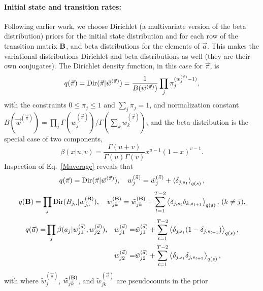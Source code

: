 \paragraph{Initial state and transition rates:}
Following earlier
work\cite{Mackay1997,Beal2003,Bronson2009,Persson2013}, we choose
Dirichlet (a multivariate version of the beta
distribution\cite{wiki:dirichlet}) priors for the initial state
distribution and for each row of the transition matrix $\mathbf{B}$,
and beta distributions for the elements of $\vec a$. This makes the
variational distributions Dirichlet and beta distributions as well
(they are their own conjugates). The Dirichlet density function, in
this case for $\vec\pi$, is
\begin{equation}\label{eq:p0pi}
        q(\vec\pi)=\text{Dir}(\vec\pi|\vec{w}^{(\vec{\pi})})=\frac{1}{B(\vec
        w^{(\vec\pi)})}\prod_j \pi_j^{(w_j^{(\vec\pi)}-1)},
\end{equation}
with the constraints $0\le \pi_j\le1$ and $\sum_j\pi_j=1$, and
normalization constant $B(\vec
w^{(\vec\pi)})=\prod_j\Gamma(w_j^{(\vec\pi)})/\Gamma(\sum_kw_k^{(\vec\pi)})$\cite{wiki:dirichlet},
and the beta distribution is the special case of two components,
\begin{equation}
\beta(x|u,v)=\frac{\Gamma(u+v)}{\Gamma(u)\Gamma(v)}x^{u-1}(1-x)^{v-1}.
\end{equation}
Inspection of Eq.~\eqref{Maverage} reveals that
\begin{equation}\label{VBM_pi}
  q(\vec{\pi})=\text{Dir}(\vec{\pi}|\vec{w}^{(\vec{\pi})}),\quad
w_j^{(\vec{\pi})}=\tilde
w_j^{(\vec{\pi})}+\left\langle \delta_{j,s_1}\right\rangle_{q(s)},
\end{equation}
\begin{equation}\label{VBM_B}
  q(\mathbf{B})=\prod_j
  \text{Dir}(B_{j,:}|w_{j,:}^{(\mathbf{B})}),\quad
w_{jk}^{(\mathbf{B})}=\tilde w_{jk}^{(\mathbf{B})}
  +\sum_{t=1}^{T-2}\left\langle \delta_{j,s_t}\delta_{k,s_{t+1}}\right\rangle_{q(s)}\text{, ($k\ne j$),}
\end{equation}
\begin{align}
  q(\vec{a})=&\prod_j \beta(a_j|w_{j1}^{(\vec{a})},w_{j2}^{(\vec{a})}),&
  w_{j1}^{(\vec{a})}=&\tilde w_{j1}^{(\vec{a})}
  +\sum_{t=1}^{T-2}\left\langle \delta_{j,s_t}(1-\delta_{j,s_{t+1}})\right\rangle_{q(s)},\nonumber\\
  &&  
w_{j2}^{(\vec{a})}=&\tilde w_{j2}^{(\vec{a})}
  +\sum_{t=1}^{T-2}\left\langle \delta_{j,s_t}\delta_{j,s_{t+1}}\right\rangle_{q(s)},
\label{VBM_a}
\end{align}
with where $\tilde w_j^{(\vec{\pi})}$, $\tilde w_{jk}^{(\mathbf{B})}$,
and $\tilde w_{jk}^{(\vec{a})}$ are pseudocounts in the prior

